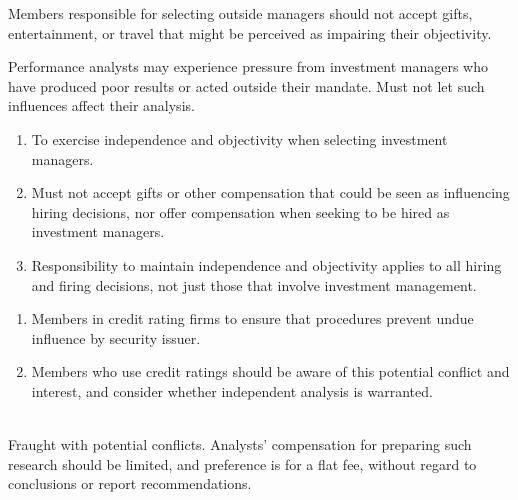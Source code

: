 \begin{remark} 
Members responsible for selecting outside managers should not accept gifts, entertainment, or travel that might be perceived as impairing their objectivity.
\end{remark}

\begin{remark} 
Performance analysts may experience pressure from investment managers who have produced poor results or acted outside their mandate. Must not let such influences affect their analysis.
\end{remark}

\begin{remark} 
\begin{enumerate}[label=\roman*.]
\setlength{\itemsep}{0pt}
\item To exercise independence and objectivity when selecting investment managers.
\item Must not accept gifts or other compensation that could be seen as influencing hiring decisions, nor offer compensation when seeking to be hired as investment managers.
\item Responsibility to maintain independence and objectivity applies to all hiring and firing decisions, not just those that involve investment management.
\end{enumerate}
\end{remark}

\begin{remark} 
\begin{enumerate}[label=\roman*.]
\setlength{\itemsep}{0pt}
\item Members in credit rating firms to ensure that procedures prevent undue influence by security issuer.
\item Members who use credit ratings should be aware of this potential conflict and interest, and consider whether independent analysis is warranted.
\end{enumerate}
\end{remark}

\begin{remark} \\
Fraught with potential conflicts. Analysts' compensation for preparing such research should be limited, and preference is for a flat fee, without regard to conclusions or report recommendations.
\end{remark}


